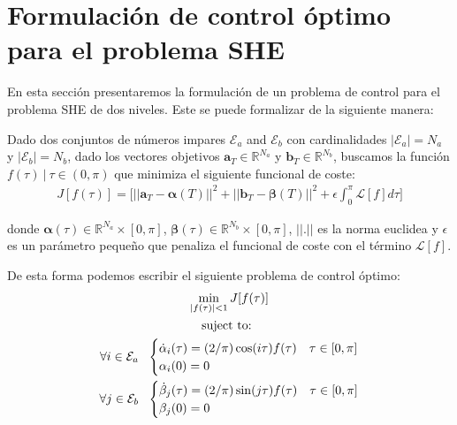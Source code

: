
\section{Formulación de control óptimo para el problema SHE}

En esta sección presentaremos la formulación de un problema de control para el problema SHE de dos niveles. Este se puede formalizar de la siguiente manera:

\begin{problem}\label{OCP1}
    Dado dos conjuntos de números impares $\mathcal{E}_a$ and $\mathcal{E}_b$ con cardinalidades $|\mathcal{E}_a| = N_a$ y  $|\mathcal{E}_b| = N_b$, dado los vectores objetivos $\bm{a}_T  \in \mathbb{R}^{N_a}$ y $\bm{b}_T  \in \mathbb{R}^{N_b}$, buscamos la función  $f(\tau ) \ | \ \tau \in (0,\pi)$ que minimiza el siguiente funcional de coste:
        \begin{gather}
        J[f(\tau)] = \Bigg[ || \bm{a}_T - \bm{\alpha}(T)||^2 + || \bm{b}_T - \bm{\beta}(T)||^2 
        + \epsilon \int_0^{\pi} \mathcal{L}[f] d\tau \Bigg] 
    \end{gather}

    donde  $\bm{\alpha}(\tau) \in \mathbb{R}^{N_a} \times [0,\pi]$, $\bm{\beta}(\tau) \in \mathbb{R}^{N_b}  \times [0,\pi]$,  $||.||$ es la norma euclidea y $\epsilon$ es un parámetro pequeño que penaliza el funcional de coste con el término $\mathcal{L}[f]$. 
    \newline

    De esta forma podemos escribir el siguiente problema de control óptimo:
    \begin{gather}
        \min_{|f(\tau) |<1} J[f(\tau)] \\
        \notag \text{suject to: } \\
        \notag \forall i \in \mathcal{E}_a\ \ 
        \begin{cases}
            \dot{\alpha}_i(\tau) = (2/\pi) \cos(i\tau) f(\tau) & \tau \in [0,\pi]\label{dyn}\\
            \alpha_i(0) = 0
        \end{cases} \\
        \notag \forall j \in \mathcal{E}_b\ \ 
        \begin{cases}
            \dot{\beta}_j(\tau) = (2/\pi) \sin(j\tau) f(\tau) & \tau \in [0,\pi]\label{dyn}\\
            \beta_j(0) = 0
        \end{cases} \\
    \end{gather}
\end{problem}

